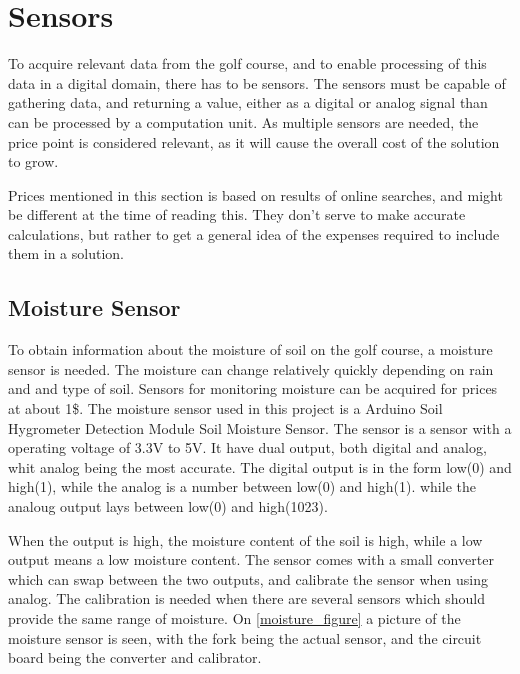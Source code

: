 \section{Sensors}
To acquire relevant data from the golf course, and to enable processing of this data in a digital domain, there has to be sensors.
The sensors must be capable of gathering data, and returning a value, either as a digital or analog signal than can be processed by a computation unit.
As multiple sensors are needed, the price point is considered relevant, as it will cause the overall cost of the solution to grow.

Prices mentioned in this section is based on results of online searches, and might be different at the time of reading this.
They don't serve to make accurate calculations, but rather to get a general idea of the expenses required to include them in a solution.

\subsection{Moisture Sensor}
To obtain information about the moisture of soil on the golf course, a moisture sensor is needed.
The moisture can change relatively quickly depending on rain and and type of soil.
Sensors for monitoring moisture can be acquired for prices at about 1\$.
The moisture sensor used in this project is a Arduino Soil Hygrometer Detection Module Soil Moisture Sensor.
The sensor is a sensor with a operating voltage of 3.3V to 5V.
It have dual output, both digital and analog, whit analog being the most accurate.
The digital output is in the form low(0) and high(1), while the analog is a number between low(0) and high(1)\cite{moisture}.
while the analoug output lays between low(0) and high(1023).

When the output is high, the moisture content of the soil is high, while a low output means a low moisture content.
The sensor comes with a small converter which can swap between the two outputs, and calibrate the sensor when using analog.
The calibration is needed when there are several sensors which should provide the same range of moisture.
On \ref{moisture_figure} a picture of the moisture sensor is seen, with the fork being the actual sensor, and the circuit board being the converter and calibrator. 

